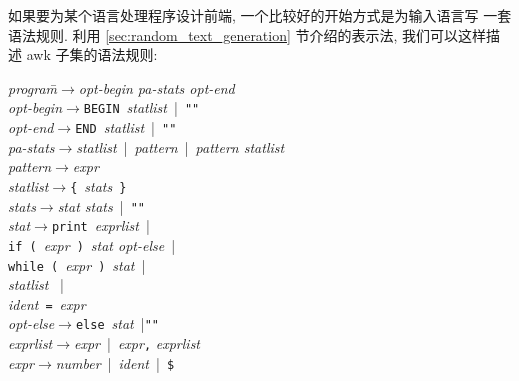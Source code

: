 如果要为某个语言处理程序设计前端, 一个比较好的开始方式是为输入语言写
一套语法规则. 利用 \ref{sec:random_text_generation} 节介绍的表示法,
我们可以这样描述 awk 子集的语法规则:
\begin{tabbing}
    \hspace{4em}
    \textit{program}\hspace{2em}\=$\to$\hspace{2em}\=\textit{opt-begin pa-stats
    opt-end}\\
    \hspace{4em}
    \textit{opt-begin}\>$\to$\>\texttt{BEGIN}\ \textit{statlist}\ |\ 
    \texttt{""}\\
    \hspace{4em}
    \textit{opt-end}\>$\to$\>\texttt{END}\ \textit{statlist}\ |\ 
    \texttt{""}\\
    \hspace{4em}
    \textit{pa-stats}\>$\to$\>\textit{statlist}\ |\ \textit{pattern}\ |\ 
    \textit{pattern statlist} \\
    \hspace{4em}
    \textit{pattern}\>$\to$\>\textit{expr}\\
    \hspace{4em}
    \textit{statlist}\>$\to$\>\verb'{'\ \textit{stats}\ \verb'}'\\
    \hspace{4em}
    \textit{stats}\>$\to$\>\textit{stat stats}\ |\ \texttt{""}\\
    \hspace{4em}
    \textit{stat}\>$\to$\>\texttt{print}\ \textit{exprlist}\ |\ \\
    \>\>\texttt{if (}\ \textit{expr}\ \texttt{)}\ \textit{stat opt-else}\ |\\
    \>\>\texttt{while (}\ \textit{expr}\ \texttt{)}\ \textit{stat}\ |\\
    \>\>\textit{statlist} \ | \\
    \>\>\textit{ident}\ \texttt{=}\ \textit{expr} \\
    \hspace{4em}
    \textit{opt-else}\>$\to$\>\texttt{else}\ \textit{stat}\ |\texttt{""} \\
    \hspace{4em}
    \textit{exprlist}\>$\to$\>\textit{expr}\ |\ \textit{expr}\texttt{,}
    \textit{exprlist}\\
    \hspace{4em}
    \textit{expr}\>$\to$\>\textit{number}\ |\ \textit{ident}\ |\ \texttt{\$}

\end{tabbing}

